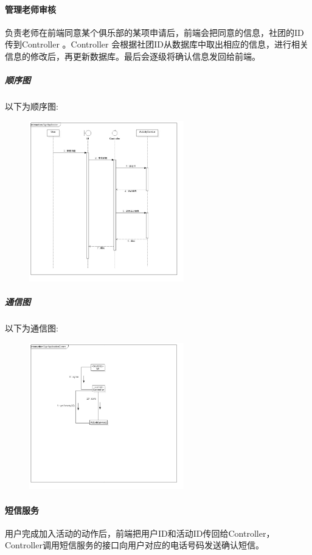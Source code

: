\documentclass[UTF8]{ctexart}
\begin{document}
\paragraph{管理老师审核}
负责老师在前端同意某个俱乐部的某项申请后，前端会把同意的信息，社团的ID传到Controller 。Controller 会根据社团ID从数据库中取出相应的信息，进行相关信息的修改后，再更新数据库。最后会逐级将确认信息发回给前端。

\subparagraph*{顺序图}
以下为顺序图:\\
\begin{figure}[H]
\centering
\includegraphics[width = 0.6\textwidth]{signApplicationSeq.jpg}
\end{figure}

\subparagraph*{通信图}
以下为通信图:\\
\begin{figure}[H]
\centering
\includegraphics[width = 0.6\textwidth]{signApplicationComm.jpg}
\end{figure}

\paragraph{短信服务}
用户完成加入活动的动作后，前端把用户ID和活动ID传回给Controller，Controller调用短信服务的接口向用户对应的电话号码发送确认短信。
\end{document}
